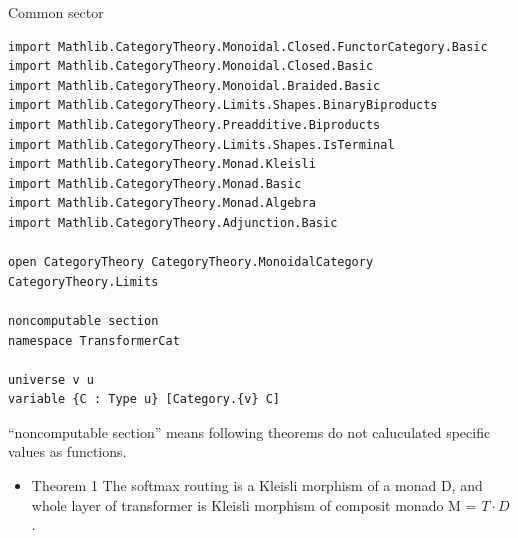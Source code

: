 \documentclass[a4paper,11pt]{article}
\begin{document}
Common sector

\begin{lstlisting}
import Mathlib.CategoryTheory.Monoidal.Closed.FunctorCategory.Basic
import Mathlib.CategoryTheory.Monoidal.Closed.Basic
import Mathlib.CategoryTheory.Monoidal.Braided.Basic
import Mathlib.CategoryTheory.Limits.Shapes.BinaryBiproducts
import Mathlib.CategoryTheory.Preadditive.Biproducts
import Mathlib.CategoryTheory.Limits.Shapes.IsTerminal
import Mathlib.CategoryTheory.Monad.Kleisli
import Mathlib.CategoryTheory.Monad.Basic
import Mathlib.CategoryTheory.Monad.Algebra
import Mathlib.CategoryTheory.Adjunction.Basic

open CategoryTheory CategoryTheory.MonoidalCategory CategoryTheory.Limits

noncomputable section
namespace TransformerCat

universe v u
variable {C : Type u} [Category.{v} C]
\end{lstlisting}

``noncomputable section'' means following theorems do not caluculated
specific values as functions.

\begin{itemize}
\item
  Theorem 1 The softmax routing is a Kleisli morphism of a monad D, and   whole layer of transformer is Kleisli morphism of composit monado M =  $T \cdot D$.
\end{itemize}
\end{document}
